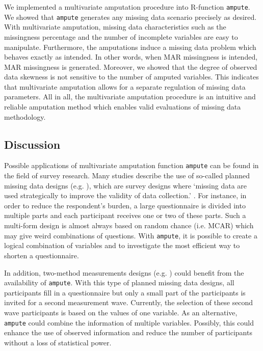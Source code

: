 \documentclass[]{interact}
\newcommand{\code}[1]{\texttt{#1}}
\begin{document}
We implemented a multivariate amputation procedure into R-function \code{ampute}. We showed that \code{ampute} generates any missing data scenario precisely as desired. With multivariate amputation, missing data characteristics such as the missingness percentage and the number of incomplete variables are easy to manipulate. Furthermore, the amputations induce a missing data problem which behaves exactly as intended. In other words, when MAR missingness is intended, MAR missingness is generated. Moreover, we showed that the degree of observed data skewness is not sensitive to the number of amputed variables. This indicates that multivariate amputation allows for a separate regulation of missing data parameters. All in all, the multivariate amputation procedure is an intuitive and reliable amputation method which enables valid evaluations of missing data methodology. 

\subsection{\normalsize Discussion}

Possible applications of multivariate amputation function \code{ampute} can be found in the field of survey research. Many studies describe the use of so-called planned missing data designs (e.g. \citep{Enders, Wu, Bunting}), which are survey designs where `missing data are used strategically to improve the validity of data collection.' \citep[][p. 426]{Rhemtulla2012}. For instance, in order to reduce the respondent's burden, a large questionnaire is divided into multiple parts and each participant receives one or two of these parts. Such a multi-form design is almost always based on random chance (i.e. MCAR) which may give weird combinations of questions. With \code{ampute}, it is possible to create a logical combination of variables and to investigate the most efficient way to shorten a questionnaire. 

In addition, two-method measurements designs (e.g. \citep{Graham2006, Rhemtulla2012}) could benefit from the availability of \code{ampute}. With this type of planned missing data designs, all participants fill in a questionnaire but only a small part of the participants is invited for a second measurement wave. Currently, the selection of these second wave participants is based on the values of one variable. As an alternative, \code{ampute} could combine the information of multiple variables. Possibly, this could enhance the use of observed information and reduce the number of participants without a loss of statistical power. 
\end{document}
